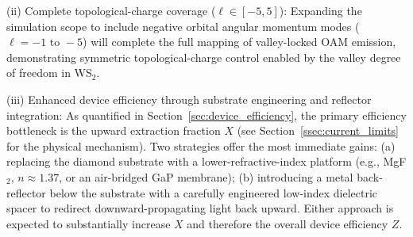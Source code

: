 (ii) Complete topological-charge coverage ($\ell \in [-5, 5]$): Expanding the simulation scope to include negative orbital angular momentum modes ($\ell = -1 \text{ to } -5$) will complete the full mapping of valley-locked OAM emission, demonstrating symmetric topological-charge control enabled by the valley degree of freedom in WS$_2$.

(iii) Enhanced device efficiency through substrate engineering and reflector integration: As quantified in Section~\ref{sec:device_efficiency}, the primary efficiency bottleneck is the upward extraction fraction $X$ (see Section~\ref{ssec:current_limits} for the physical mechanism). Two strategies offer the most immediate gains: (a) replacing the diamond substrate with a lower-refractive-index platform (e.g., MgF$_2$, $n \approx 1.37$, or an air-bridged GaP membrane); (b) introducing a metal back-reflector below the substrate with a carefully engineered low-index dielectric spacer to redirect downward-propagating light back upward. Either approach is expected to substantially increase $X$ and therefore the overall device efficiency $Z$.
